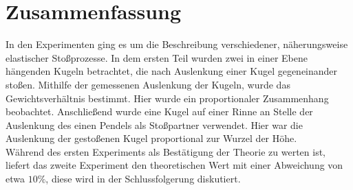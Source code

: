 
\section{Zusammenfassung}
In den Experimenten ging es um die Beschreibung verschiedener, näherungsweise elastischer  Stoßprozesse.  In dem ersten Teil wurden zwei in einer Ebene hängenden Kugeln betrachtet, die nach Auslenkung einer Kugel gegeneinander stoßen. Mithilfe der gemessenen Auslenkung der Kugeln, wurde das Gewichtsverhältnis bestimmt. Hier wurde ein proportionaler Zusammenhang beobachtet. Anschließend wurde eine Kugel auf einer Rinne an Stelle der Auslenkung des einen Pendels als Stoßpartner verwendet. Hier war die Auslenkung der gestoßenen Kugel proportional zur Wurzel der Höhe.\\
Während des ersten Experiments als Bestätigung der Theorie zu werten ist, liefert das zweite Experiment den theoretischen Wert mit einer Abweichung von etwa $10\%$, diese wird in der Schlussfolgerung diskutiert.


